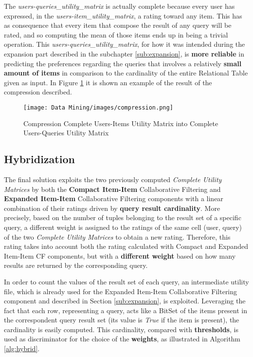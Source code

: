 The \textit{users-queries\_utility\_matrix} is actually complete because every user has expressed, in the \textit{users-item\_utility\_matrix}, a rating toward any item. This has as consequence that every item that compose the result of any query will be rated, and so computing the mean of those items ends up in being a trivial operation. This \textit{users-queries\_utility\_matrix}, for how it was intended during the expansion part described in the subchapter \ref{sub:expansion}, is \textbf{more reliable} in predicting the preferences regarding the queries that involves a relatively \textbf{small amount of items} in comparison to the cardinality of the entire Relational Table given as input. In Figure \ref{fig:compression} it is shown an example of the result of the compression described.

\begin{figure}[h!]
\centering
\texttt{[image: Data Mining/images/compression.png]}
\caption{Compression Complete Users-Items Utility Matrix into Complete Users-Queries Utility Matrix}
\label{fig:compression}
\end{figure}

\subsection{Hybridization}
\label{cap:hybridization}
The final solution exploits the two previously computed \textit{Complete Utility Matrices} by both the \textbf{Compact Item-Item} Collaborative Filtering and \textbf{Expanded Item-Item} Collaborative Filtering components with a linear combination of their ratings driven by \textbf{query result cardinality}.
More precisely, based on the number of tuples belonging to the result set of a specific query, a different weight is assigned to the ratings of the same cell (user, query) of the two \textit{Complete Utility Matrices} to obtain a new rating.
Therefore, this rating takes into account both the rating calculated with Compact and Expanded Item-Item CF components, but with a \textbf{different weight} based on how many results are returned by the corresponding query.

In order to count the values of the result set of each query, an intermediate utility file, which is already used for the Expanded Item-Item Collaborative Filtering component and described in Section \ref{sub:expansion}, is exploited.
Leveraging the fact that each row, representing a query, acts like a BitSet of the items present in the correspondent query result set (its value is \textit{True} if the item is present), the cardinality is easily computed.
This cardinality, compared with \textbf{thresholds}, is used as discriminator for the choice of the \textbf{weights}, as illustrated in Algorithm \ref{alg:hybrid}.

